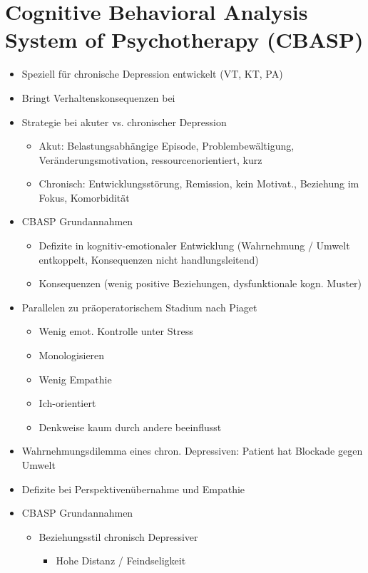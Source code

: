 \documentclass[11pt, paper=a4, twocolumn]{scrartcl}
\begin{document}
	\section{Cognitive Behavioral Analysis System of Psychotherapy (CBASP)}
		\begin{itemize}
			\item Speziell für chronische Depression entwickelt (VT, KT, PA)
			\item Bringt Verhaltenskonsequenzen bei
			\item Strategie bei akuter vs. chronischer Depression
				\begin{itemize}
					\item Akut: Belastungsabhängige Episode, Problembewältigung, Veränderungsmotivation, ressourcenorientiert, kurz
					\item Chronisch: Entwicklungsstörung, Remission, kein Motivat., Beziehung im Fokus, Komorbidität
				\end{itemize}
			\item CBASP Grundannahmen
				\begin{itemize}
					\item Defizite in kognitiv-emotionaler Entwicklung (Wahrnehmung / Umwelt entkoppelt, Konsequenzen nicht 
						handlungsleitend)
					\item Konsequenzen (wenig positive Beziehungen, dysfunktionale kogn. Muster)
				\end{itemize}
			\item Parallelen zu präoperatorischem Stadium nach Piaget
				\begin{itemize}
					\item Wenig emot. Kontrolle unter Stress
					\item Monologisieren
					\item Wenig Empathie
					\item Ich-orientiert
					\item Denkweise kaum durch andere beeinflusst
				\end{itemize}
			\item Wahrnehmungsdilemma eines chron. Depressiven: Patient hat Blockade gegen Umwelt
			\item Defizite bei Perspektivenübernahme und Empathie
			\item CBASP Grundannahmen
				\begin{itemize}
					\item Beziehungsstil chronisch Depressiver
						\begin{itemize}
							\item Hohe Distanz / Feindseligkeit

\end{itemize}
\end{itemize}
\end{itemize}
\end{document}
